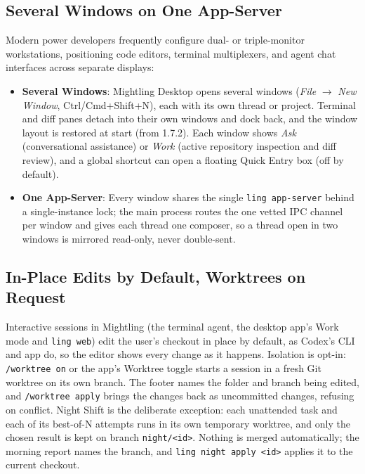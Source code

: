 \documentclass[11pt]{article}
\newcommand{\code}[1]{\texttt{#1}}
\begin{document}
\subsection{Several Windows on One App-Server}

Modern power developers frequently configure dual- or triple-monitor workstations, positioning code editors, terminal
multiplexers, and agent chat interfaces across separate displays:
\begin{itemize}
    \item \textbf{Several Windows}: Mightling Desktop opens several windows (\textit{File} $\rightarrow$ \textit{New Window},
    Ctrl/Cmd+Shift+N), each with its own thread or project. Terminal and diff panes detach into their own windows and dock
    back, and the window layout is restored at start (from 1.7.2). Each window shows \textit{Ask} (conversational
    assistance) or \textit{Work} (active repository inspection and diff review), and a global shortcut can open a
    floating Quick Entry box (off by default).
    \item \textbf{One App-Server}: Every window shares the single \code{ling app-server} behind a single-instance lock;
    the main process routes the one vetted IPC channel per window and gives each thread one composer, so a thread open in
    two windows is mirrored read-only, never double-sent.
\end{itemize}

\subsection{In-Place Edits by Default, Worktrees on Request}

Interactive sessions in Mightling (the terminal agent, the desktop app's Work mode and \code{ling web}) edit the user's
checkout in place by default, as Codex's CLI and app do, so the editor shows every change as it happens. Isolation is
opt-in: \code{/worktree on} or the app's Worktree toggle starts a session in a fresh Git worktree on its own branch. The
footer names the folder and branch being edited, and \code{/worktree apply} brings the changes back as uncommitted
changes, refusing on conflict. Night Shift is the deliberate exception: each unattended task and each of its best-of-N
attempts runs in its own temporary worktree, and only the chosen result is kept on branch \code{night/<id>}. Nothing is
merged automatically; the morning report names the branch, and \code{ling night apply <id>} applies it to the current
checkout.
\end{document}
